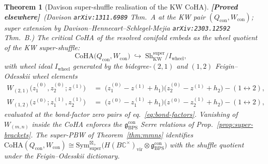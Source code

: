 \documentclass[11pt]{amsart}
\newtheorem{theorem}{Theorem}[section]
\theoremstyle{definition}
\providecommand{\CoHA}{\mathrm{CoHA}}
\providecommand{\bC}{\mathbb{C}}
\providecommand{\fg}{\mathfrak{g}}
\providecommand{\ClaimStatusProvedElsewhere}{\textbf{\textsf{[Proved elsewhere]}}}
\begin{document}
\begin{theorem}[Davison super-shuffle realisation of the KW CoHA]
\label{thm:davison-shuffle-coha}
\ClaimStatusProvedElsewhere\
(Davison \texttt{arXiv:1311.6989} Thm.~A at the KW pair
$(Q_{\mathrm{con}}, W_{\mathrm{con}})$; super extension by
Davison--Hennecart--Schlegel-Mejia \texttt{arXiv:2303.12592} Thm.~B.)
The critical CoHA of the resolved conifold embeds as the wheel
quotient of the KW super-shuffle:
\begin{equation}\label{eq:davison-shuffle}
  \CoHA\bigl(Q_{\mathrm{con}}, W_{\mathrm{con}}\bigr)
  \;\hookrightarrow\;
  \mathrm{Sh}^{\mathrm{super}}_{\mathrm{KW}} / I_{\mathrm{wheel}},
\end{equation}
with wheel ideal $I_{\mathrm{wheel}}$ generated by the
bidegree-$(2,1)$ and $(1,2)$ Feigin--Odesskii wheel elements
\begin{equation}\label{eq:wheel-elements}
\begin{aligned}
  W_{(2,1)}\bigl(z^{(0)}_1, z^{(0)}_2; z^{(1)}\bigr)
  &\;=\;
  \bigl(z^{(0)}_1 - z^{(1)} + h_1\bigr)
  \bigl(z^{(0)}_2 - z^{(1)} + h_2\bigr)
  - (1 \leftrightarrow 2), \\
  W_{(1,2)}\bigl(z^{(0)}; z^{(1)}_1, z^{(1)}_2\bigr)
  &\;=\;
  \bigl(z^{(0)} - z^{(1)}_1 + h_1\bigr)
  \bigl(z^{(0)} - z^{(1)}_2 + h_2\bigr)
  - (1 \leftrightarrow 2),
\end{aligned}
\end{equation}
evaluated at the bond-factor zero pairs of eq.~\eqref{eq:bond-factors}.
Vanishing of $W_{(m, n)}$ inside the CoHA enforces the
$\fg_{\mathrm{BPS}}^{\mathrm{con}}$ Serre relations of
Prop.~\ref{prop:super-brackets}. The super-PBW of
Theorem~\ref{thm:mmns} identifies
$\CoHA(Q_{\mathrm{con}}, W_{\mathrm{con}}) \cong
\mathrm{Sym}^{\boxtimes_+}_{\mathrm{super}}\bigl(
H(B\bC^\times)_{\mathrm{vir}} \otimes \fg_{\mathrm{BPS}}^{\mathrm{con}}
\bigr)$ with the shuffle quotient under the Feigin--Odesskii
dictionary.
\end{theorem}
\end{document}
